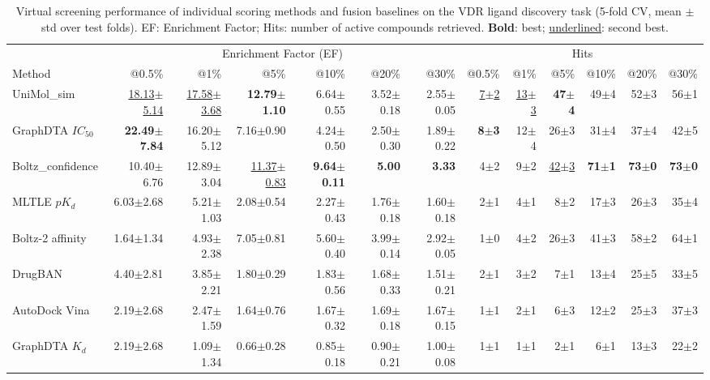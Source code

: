 \begin{table}[htbp!]
\centering
\caption{Virtual screening performance of individual scoring methods and fusion baselines on the VDR ligand discovery task (5-fold CV, mean $\pm$ std over test folds). EF: Enrichment Factor; Hits: number of active compounds retrieved. \textbf{Bold}: best; \underline{underlined}: second best.}
\label{tab:fusion_performance}
\small
\begin{tabular}{lrrrrrr|rrrrrr}
\toprule
& \multicolumn{6}{c|}{Enrichment Factor (EF)} & \multicolumn{6}{c}{Hits} \\
Method & @0.5\% & @1\% & @5\% & @10\% & @20\% & @30\% & @0.5\% & @1\% & @5\% & @10\% & @20\% & @30\% \\
\midrule
UniMol_sim & \underline{18.13$\pm$5.14} & \underline{17.58$\pm$3.68} & \textbf{12.79$\pm$1.10} & 6.64$\pm$0.55 & 3.52$\pm$0.18 & 2.55$\pm$0.05 & \underline{7$\pm$2} & \underline{13$\pm$3} & \textbf{47$\pm$4} & 49$\pm$4 & 52$\pm$3 & 56$\pm$1 \\
GraphDTA $IC_{50}$ & \textbf{22.49$\pm$7.84} & 16.20$\pm$5.12 & 7.16$\pm$0.90 & 4.24$\pm$0.50 & 2.50$\pm$0.30 & 1.89$\pm$0.22 & \textbf{8$\pm$3} & 12$\pm$4 & 26$\pm$3 & 31$\pm$4 & 37$\pm$4 & 42$\pm$5 \\
Boltz_confidence & 10.40$\pm$6.76 & 12.89$\pm$3.04 & \underline{11.37$\pm$0.83} & \textbf{9.64$\pm$0.11} & \textbf{5.00} & \textbf{3.33} & 4$\pm$2 & 9$\pm$2 & \underline{42$\pm$3} & \textbf{71$\pm$1} & \textbf{73$\pm$0} & \textbf{73$\pm$0} \\
MLTLE $pK_d$ & 6.03$\pm$2.68 & 5.21$\pm$1.03 & 2.08$\pm$0.54 & 2.27$\pm$0.43 & 1.76$\pm$0.18 & 1.60$\pm$0.18 & 2$\pm$1 & 4$\pm$1 & 8$\pm$2 & 17$\pm$3 & 26$\pm$3 & 35$\pm$4 \\
Boltz-2 affinity & 1.64$\pm$1.34 & 4.93$\pm$2.38 & 7.05$\pm$0.81 & 5.60$\pm$0.40 & 3.99$\pm$0.14 & 2.92$\pm$0.05 & 1$\pm$0 & 4$\pm$2 & 26$\pm$3 & 41$\pm$3 & 58$\pm$2 & 64$\pm$1 \\
DrugBAN & 4.40$\pm$2.81 & 3.85$\pm$2.21 & 1.80$\pm$0.29 & 1.83$\pm$0.56 & 1.68$\pm$0.33 & 1.51$\pm$0.21 & 2$\pm$1 & 3$\pm$2 & 7$\pm$1 & 13$\pm$4 & 25$\pm$5 & 33$\pm$5 \\
AutoDock Vina & 2.19$\pm$2.68 & 2.47$\pm$1.59 & 1.64$\pm$0.76 & 1.67$\pm$0.32 & 1.69$\pm$0.18 & 1.67$\pm$0.15 & 1$\pm$1 & 2$\pm$1 & 6$\pm$3 & 12$\pm$2 & 25$\pm$3 & 37$\pm$3 \\
GraphDTA $K_{d}$ & 2.19$\pm$2.68 & 1.09$\pm$1.34 & 0.66$\pm$0.28 & 0.85$\pm$0.18 & 0.90$\pm$0.21 & 1.00$\pm$0.08 & 1$\pm$1 & 1$\pm$1 & 2$\pm$1 & 6$\pm$1 & 13$\pm$3 & 22$\pm$2 \\

\end{tabular}
\end{table}
